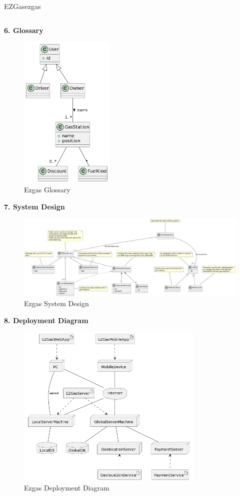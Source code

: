 \documentclass[12pt]{article}
\begin{document}
\begin{example}{EZGas}{ezgas}
\begin{table}[H]
\begin{tabular}{|l|l|l|}
      \hline
    \end{tabular}
  \end{table}
  \textbf{6. Glossary}
  \begin{figure}[H]
    \centering
    \includegraphics[width=0.4\textwidth]{ezgas-glossary.png}
    \caption{Ezgas Glossary}
    \label{fig:ezgas-glossary}
  \end{figure}
  \textbf{7. System Design}
  \begin{figure}[H]
    \centering
    \includegraphics[width=1\textwidth]{ezgas-system-design.png}
    \caption{Ezgas System Design}
    \label{fig:ezgas-system-design}
  \end{figure}
  \textbf{8. Deployment Diagram}
  \begin{figure}[H]
    \centering
    \includegraphics[width=0.8\textwidth]{ezgas-deployment-diagram.png}
    \caption{Ezgas Deployment Diagram}
    \label{fig:ezgas-deployment-diagram}
  \end{figure}
\end{example}
\end{document}
